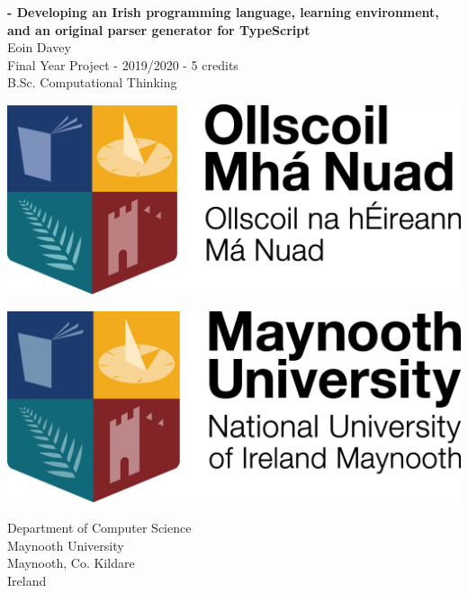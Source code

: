 \begin{titlepage}
    \begin{center}
        \begin{LARGE}
        \textbf{\Setanta{} - Developing an Irish programming language, learning environment, and an original parser generator for TypeScript}\\
            Eoin Davey\\
        Final Year Project - 2019/2020 - 5 credits\\
        B.Sc. Computational Thinking\\

        \vspace{10mm}

        \begin{minipage}[t]{0.45\textwidth}
            \includegraphics[scale=0.6]{ollscoillogo}
        \end{minipage}\qquad
        \begin{minipage}[t]{0.45\textwidth}
            \includegraphics[scale=0.6]{maynoothlogo}
        \end{minipage}

        \vspace{25mm}

        Department of Computer Science\\
        Maynooth University\\
        Maynooth, Co. Kildare\\
        Ireland


\end{LARGE}
\end{center}
\end{titlepage}
